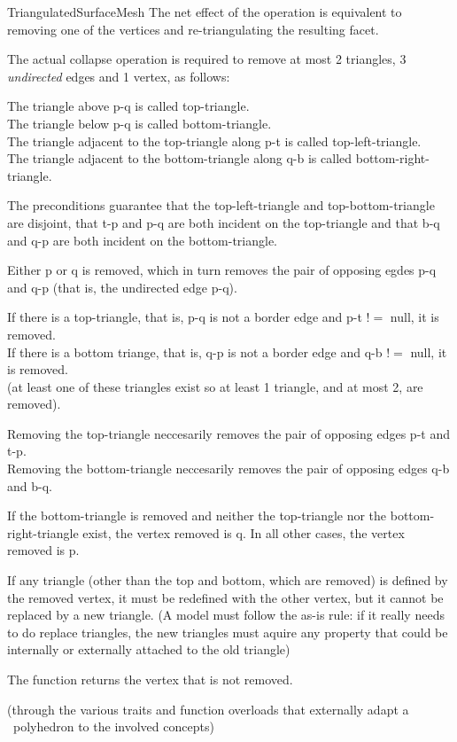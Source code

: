 \begin{ccRefConcept}{TriangulatedSurfaceMesh}
The net effect of the operation is equivalent to removing one of the vertices
and re-triangulating the resulting facet.

The actual collapse operation is required to remove at most 
2 triangles, 3 {\em undirected} edges and 1 vertex, as follows:

The triangle above p-q is called top-triangle.\\
The triangle below p-q is called bottom-triangle.\\
The triangle adjacent to the top-triangle along p-t is called top-left-triangle.\\
The triangle adjacent to the bottom-triangle along q-b is called bottom-right-triangle.

The preconditions guarantee that the top-left-triangle and top-bottom-triangle
are disjoint, that t-p and p-q are both incident on the top-triangle and that
b-q and q-p are both incident on the bottom-triangle.
      
Either p or q is removed, which in turn removes the pair of opposing egdes 
p-q and q-p (that is, the undirected edge p-q).

If there is a top-triangle, that is, p-q is not a border edge and p-t $!=$ null, it is removed.\\
If there is a bottom triange, that is, q-p is not a border edge and q-b $!=$ null, it is removed.\\
(at least one of these triangles exist so at least 1 triangle, and at most 2, are removed).
  
Removing the top-triangle neccesarily removes the pair of opposing edges p-t and t-p.\\
Removing the bottom-triangle neccesarily removes the pair of opposing edges q-b and b-q.
      
If the bottom-triangle is removed and neither the top-triangle nor
the bottom-right-triangle exist, the vertex removed is q. In all other
cases, the vertex removed is p.

If any triangle (other than the top and bottom, which are removed) is defined by
the removed vertex, it must be redefined with the other vertex, but it cannot
be replaced by a new triangle. (A model must follow the as-is rule: if it really
needs to do replace triangles, the new triangles must aquire any property 
that could be internally or externally attached to the old triangle)

The function returns the vertex that is not removed.

\ccHasModels
{}
  (through the various traits and function overloads that externally adapt a \cgal\
  polyhedron to the involved concepts)

\end{ccRefConcept}

